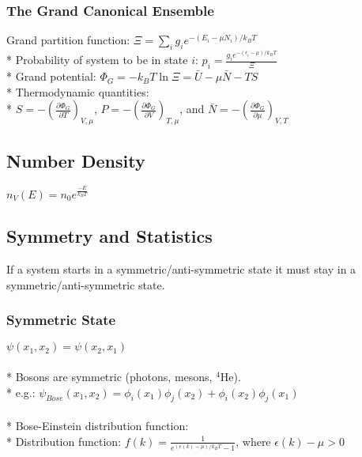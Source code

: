 \subsubsection{The Grand Canonical Ensemble}
Grand partition function: \(\displaystyle \Xi=\sum_i{g_ie^{-(E_i-\mu N_i)/k_BT}}\)\\*
Probability of system to be in state \(i\): \(\displaystyle p_i=\frac{g_ie^{-(\epsilon_i-\mu)/k_BT}}{\Xi}\)\\*
Grand potential: \(\Phi_G=-k_BT\ln{\Xi}=\bar{U}-\mu\bar{N}-TS\)\\*
Thermodynamic quantities:\\*
\(\displaystyle S=-\left(\frac{\partial\Phi_G}{\partial T}\right)_{V,\mu}\), \(\displaystyle P=-\left(\frac{\partial\Phi_G}{\partial V}\right)_{T,\mu}\), and \(\displaystyle \bar{N}=-\left(\frac{\partial\Phi_G}{\partial \mu}\right)_{V,T}\)

\subsection{Number Density}
\(\displaystyle n_V(E)=n_0e^{\frac{-E}{k_BT}}\)

\subsection{Symmetry and Statistics}
If a system starts in a symmetric/anti-symmetric state it must stay in a symmetric/anti-symmetric state.

\subsubsection{Symmetric State}
\(\psi(x_1,x_2)=\psi(x_2,x_1)\)\\\\*
Bosons are symmetric (photons, mesons, \(^4\)He).\\*
e.g.: \(\psi_{Bose}(x_1,x_2)=\phi_i(x_1)\phi_j(x_2)+\phi_i(x_2)\phi_j(x_1)\)\\\\*
%
Bose-Einstein distribution function:\\*
Distribution function: \(\displaystyle f(k)=\frac{1}{e^{(\epsilon(k)-\mu)/k_BT}-1}\), where \(\epsilon(k)-\mu>0\)

